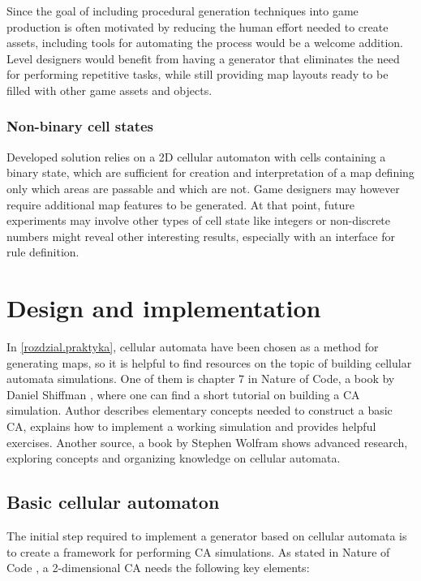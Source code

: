 \documentclass[12pt]{report}
\begin{document}
Since the goal of including procedural generation techniques into game production is often motivated by reducing the human effort needed to create assets, including tools for automating the process would be a welcome addition. Level designers would benefit from having a generator that eliminates the need for performing repetitive tasks, while still providing map layouts ready to be filled with other game assets and objects.

\subsubsection{Non-binary cell states}

Developed solution relies on a 2D cellular automaton with cells containing a binary state, which are sufficient for creation and interpretation of a map defining only which areas are passable and which are not. Game designers may however require additional map features to be generated. At that point, future experiments may involve other types of cell state like integers or non-discrete numbers might reveal other interesting results, especially with an interface for rule definition. 

\section{Design and implementation} 

In \cref{rozdzial.praktyka}, cellular automata have been chosen as a method for generating maps, so it is helpful to find resources on the topic of building cellular automata simulations. One of them is chapter 7 in Nature of Code, a book by Daniel Shiffman \autocite{shiffman2012nature}, where one can find a short tutorial on building a CA simulation. Author describes elementary concepts needed to construct a basic CA, explains how to implement a working simulation and provides helpful exercises. Another source, a book by Stephen Wolfram  \autocite{wolfram2002new} shows advanced research, exploring concepts and organizing knowledge on cellular automata.

\subsection{Basic cellular automaton}

The initial step required to implement a generator based on cellular automata is to create a framework for performing CA simulations. As stated in Nature of Code \autocite{shiffman2012nature}, a 2-dimensional CA needs the following key elements:
\end{document}

